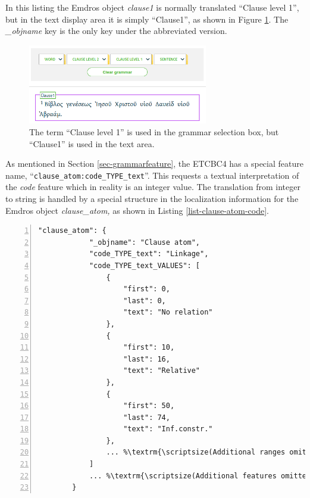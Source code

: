 \documentclass[11pt,oneside,a4paper]{memoir}
\begin{document}
In this listing the Emdros object \emph{clause1} is normally translated ``Clause level 1'', but in
the text display area it is simply ``Clause1'', as shown in Figure \ref{fig-clause1}. The
\emph{\_objname} key is the only key under the abbreviated version.

\begin{figure}[h]
  \begin{center}
    \parbox{0.7\textwidth}{
      \includegraphics[width=0.7\textwidth]{clause1.png}
      \caption{The term ``Clause level 1'' is used in the grammar selection box, but ``Clause1'' is
        used in the text area.}\label{fig-clause1}
    }
  \end{center}
\end{figure}

As mentioned in Section \ref{sec-grammarfeature}, the ETCBC4 has a special feature name,
``\texttt{clause\_atom:code\_TYPE\_text}''. This requests a textual interpretation of the
\emph{code} feature which in reality is an integer value. The translation from integer to string is
handled by a special structure in the localization information for the Emdros object
\emph{clause\_atom,} as shown in Listing \ref{list-clause-atom-code}.


\begin{lstlisting}[numbers=left,caption=Handling integer to text translation,label=list-clause-atom-code]
        "clause_atom": {
            "_objname": "Clause atom",
            "code_TYPE_text": "Linkage",
            "code_TYPE_text_VALUES": [
                {
                    "first": 0,
                    "last": 0,
                    "text": "No relation"
                },
                {
                    "first": 10,
                    "last": 16,
                    "text": "Relative"
                },
                {
                    "first": 50,
                    "last": 74,
                    "text": "Inf.constr."
                },
                ... %\textrm{\scriptsize(Additional ranges omitted)}%
            ]
            ... %\textrm{\scriptsize(Additional features omitted)}%
        }
\end{lstlisting}
\end{document}
